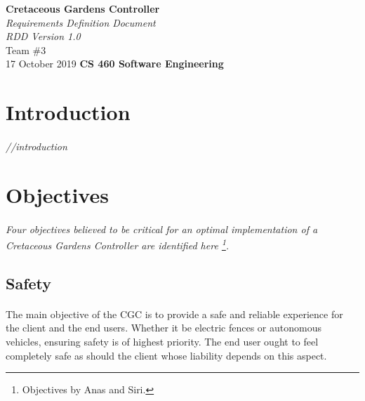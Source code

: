 \documentclass[12pt]{article}
\begin{document}
\begin{titlepage}
\begin{flushleft}
\vspace*{1cm}
\Huge
\textbf{Cretaceous Gardens Controller}\\
\vspace{1cm}
\Huge
\textit{Requirements Definition Document}\\
\vspace{1cm}
\Large
\textit{RDD Version 1.0}\\
\vspace{5cm}
\LARGE
Team \#3\\
17 October 2019
\vfill
\Huge
\textbf{CS 460 Software Engineering}
\end{flushleft}
\end{titlepage}
\normalsize
\tableofcontents
\newpage
\section{Introduction} %
\paragraph{} \textit{//introduction}

\section{Objectives} 
\label{obj}
\paragraph{} \textit{Four objectives believed to be critical for an 
optimal implementation of a \textit{Cretaceous Gardens Controller} are identified here 
\footnote{Objectives by Anas and Siri.}.}
 
	\subsection{Safety}\label{saf}
	\paragraph{}The main objective of the CGC is to provide a safe and reliable 
	experience for the client and the end users. Whether it be electric fences 
	or autonomous vehicles, ensuring safety is of highest priority. The end user
	ought to feel completely safe as should the client whose liability depends on
	this aspect.
\end{document}
